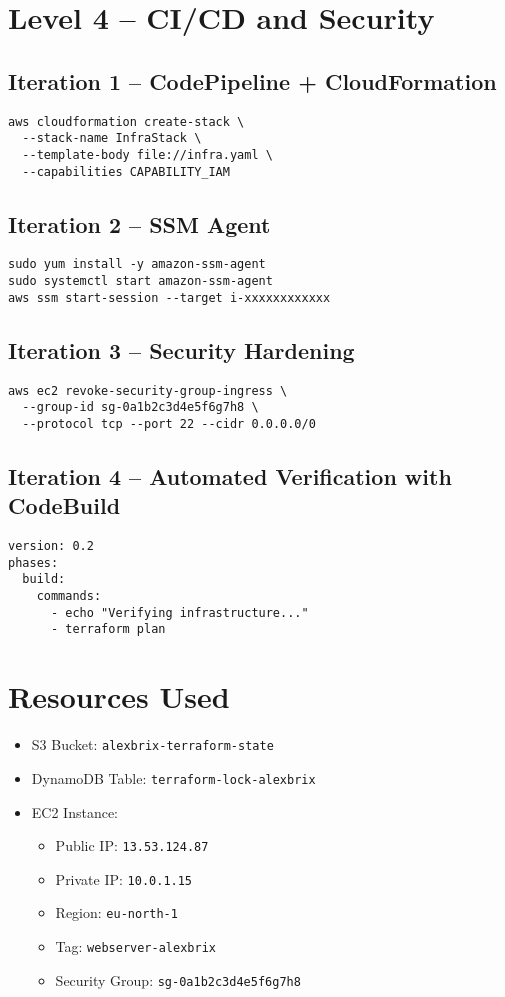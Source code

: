 \documentclass{article}
\begin{document}
\section{Level 4 – CI/CD and Security}

\subsection{Iteration 1 – CodePipeline + CloudFormation}
\begin{verbatim}
aws cloudformation create-stack \
  --stack-name InfraStack \
  --template-body file://infra.yaml \
  --capabilities CAPABILITY_IAM
\end{verbatim}

\subsection{Iteration 2 – SSM Agent}
\begin{verbatim}
sudo yum install -y amazon-ssm-agent
sudo systemctl start amazon-ssm-agent
aws ssm start-session --target i-xxxxxxxxxxxx
\end{verbatim}

\subsection{Iteration 3 – Security Hardening}
\begin{verbatim}
aws ec2 revoke-security-group-ingress \
  --group-id sg-0a1b2c3d4e5f6g7h8 \
  --protocol tcp --port 22 --cidr 0.0.0.0/0
\end{verbatim}

\subsection{Iteration 4 – Automated Verification with CodeBuild}
\begin{verbatim}
version: 0.2
phases:
  build:
    commands:
      - echo "Verifying infrastructure..."
      - terraform plan
\end{verbatim}

\section{Resources Used}
\begin{itemize}
  \item S3 Bucket: \texttt{alexbrix-terraform-state}
  \item DynamoDB Table: \texttt{terraform-lock-alexbrix}
  \item EC2 Instance:
    \begin{itemize}
      \item Public IP: \texttt{13.53.124.87}
      \item Private IP: \texttt{10.0.1.15}
      \item Region: \texttt{eu-north-1}
      \item Tag: \texttt{webserver-alexbrix}
      \item Security Group: \texttt{sg-0a1b2c3d4e5f6g7h8}
    \end{itemize}
\end{itemize}
\end{document}
